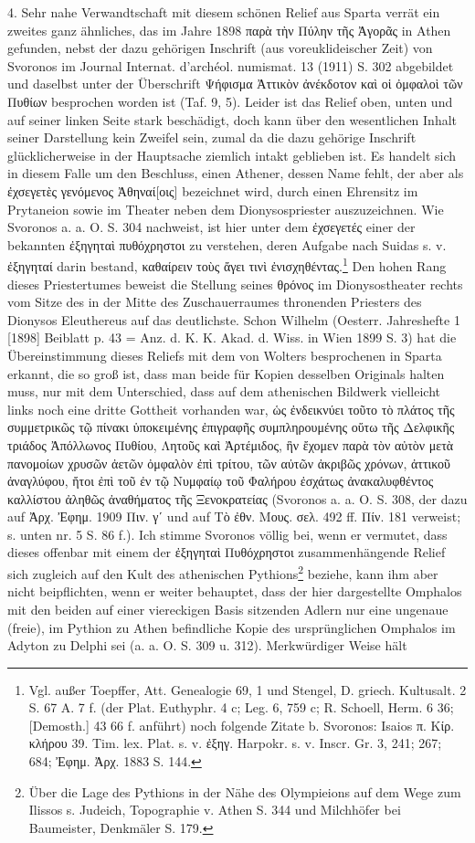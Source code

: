 \documentclass[a4paper, 11pt, oneside]{article}
\begin{document}
4. Sehr nahe Verwandtschaft mit diesem schönen Relief aus Sparta verrät ein zweites ganz ähnliches, das im Jahre 1898 παρὰ τὴν Πύλην τῆς Ἀγορᾶς in Athen gefunden, nebst der dazu gehörigen Inschrift (aus voreuklideischer Zeit) von Svoronos im Journal Internat. d'archéol. numismat. 13 (1911) S. 302 abgebildet und daselbst unter der Überschrift Ψήφισμα Ἀττικὸν ἀνέκδοτον καὶ οἱ ὀμφαλοὶ τῶν Πυθίων besprochen worden ist (Taf. 9, 5). Leider ist das Relief oben, unten und auf seiner linken Seite stark beschädigt, doch kann über den wesentlichen Inhalt seiner Darstellung kein Zweifel sein, zumal da die dazu gehörige Inschrift glücklicherweise in der Hauptsache ziemlich intakt geblieben ist. Es handelt sich in diesem Falle um den Beschluss, einen Athener, dessen Name fehlt, der aber als ἐχσεγετὲς γενόμενος Ἀθηναί[οις] bezeichnet wird, durch einen Ehrensitz im Prytaneion sowie im Theater neben dem Dionysospriester auszuzeichnen. Wie Svoronos a. a. O. S. 304 nachweist, ist hier unter dem ἐχσεγετές einer der bekannten ἐξηγηταὶ πυθόχρηστοι zu verstehen, deren Aufgabe nach Suidas s. v. ἐξηγηταί darin bestand, καθαίρειν τοὺς ἄγει τινὶ ἐνισχηθέντας.\footnote{Vgl. außer Toepffer, Att. Genealogie 69, 1 und Stengel, D. griech. Kultusalt. 2 S. 67 A. 7 f. (der Plat. Euthyphr. 4 c; Leg. 6, 759 c; R. Schoell, Herm. 6 36; [Demosth.] 43 66 f. anführt) noch folgende Zitate b. Svoronos: Isaios π. Κίρ. κλήρου 39. Tim. lex. Plat. s. v. ἐξηγ. Harpokr. s. v. Inscr. Gr. 3, 241; 267; 684; Ἐφημ. Ἀρχ. 1883 S. 144.} Den hohen Rang dieses Priestertumes beweist die Stellung seines θρόνος im Dionysostheater rechts vom Sitze des in der Mitte des Zuschauerraumes thronenden Priesters des Dionysos Eleuthereus auf das deutlichste. Schon Wilhelm (Oesterr. Jahreshefte 1 [1898] Beiblatt p. 43 = Anz. d. K. K. Akad. d. Wiss. in Wien 1899 S. 3) hat die Übereinstimmung dieses Reliefs mit dem von Wolters besprochenen in Sparta erkannt, die so groß ist, dass man beide für Kopien desselben Originals halten muss, nur mit dem Unterschied, dass auf dem athenischen Bildwerk vielleicht links noch eine dritte Gottheit vorhanden war, ὡς ἐνδεικνύει τοῦτο τὸ πλάτος τῆς συμμετρικῶς τῷ πίνακι ὑποκειμένης ἐπιγραφῆς συμπληρουμένης οὕτω τῆς Δελφικῆς τριάδος Ἀπόλλωνος Πυθίου, Λητοῦς καὶ Ἀρτέμιδος, ἣν ἔχομεν παρὰ τὸν αὐτὸν μετὰ πανομοίων χρυσῶν ἀετῶν ὀμφαλὸν ἐπὶ τρίτου, τῶν αὐτῶν ἀκριβῶς χρόνων, ἀττικοῦ ἀναγλύφου, ἤτοι ἐπὶ τοῦ ἐν τῷ Νυμφαίῳ τοῦ Φαλήρου ἐσχάτως ἀνακαλυφθέντος καλλίστου ἀληθῶς ἀναθήματος τῆς Ξενοκρατείας (Svoronos a. a. O. S. 308, der dazu auf Ἀρχ. Ἐφημ. 1909 Πιν. γʹ und auf Τὸ ἐθν. Μους. σελ. 492 ff. Πίν. 181 verweist; s. unten nr. 5 S. 86 f.). Ich stimme Svoronos völlig bei, wenn er vermutet, dass dieses offenbar mit einem der ἐξηγηταὶ Πυθόχρηστοι zusammenhängende Relief sich zugleich auf den Kult des athenischen Pythions\footnote{Über die Lage des Pythions in der Nähe des Olympieions auf dem Wege zum Ilissos s. Judeich, Topographie v. Athen S. 344 und Milchhöfer bei Baumeister, Denkmäler S. 179.} beziehe, kann ihm aber nicht beipflichten, wenn er weiter behauptet, dass der hier dargestellte Omphalos mit den beiden auf einer viereckigen Basis sitzenden Adlern nur eine ungenaue (freie), im Pythion zu Athen befindliche Kopie des ursprünglichen Omphalos im Adyton zu Delphi sei (a. a. O. S. 309 u. 312). Merkwürdiger Weise hält 
\end{document}
